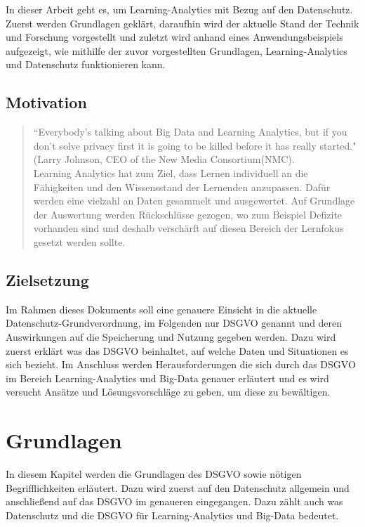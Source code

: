 \documentclass[a4paper, 12pt]{article}
\begin{document}
In dieser Arbeit geht es, um Learning-Analytics mit Bezug auf den Datenschutz. Zuerst werden Grundlagen geklärt, daraufhin wird der aktuelle Stand der Technik und Forschung vorgestellt und zuletzt wird anhand eines Anwendungsbeispiels aufgezeigt, wie mithilfe der zuvor vorgestellten Grundlagen, Learning-Analytics und Datenschutz funktionieren kann.

\subsection{Motivation}

\begin{quote}
    ``Everybody’s talking about Big Data and Learning Analytics, but if you don’t solve privacy first it is going to be killed before it has really started."(Larry Johnson, CEO of the New Media Consortium(NMC). \\
    
    Learning Analytics hat zum Ziel, dass Lernen individuell an die Fähigkeiten und den Wissensstand der Lernenden anzupassen. Dafür werden eine vielzahl an Daten gesammelt und ausgewertet. Auf Grundlage der Auswertung werden Rückschlüsse gezogen, wo zum Beispiel Defizite vorhanden sind und deshalb verschärft auf diesen Bereich der Lernfokus gesetzt werden sollte.
\end{quote}

\newpage   
\subsection{Zielsetzung}

Im Rahmen dieses Dokuments soll eine genauere Einsicht in die aktuelle Datenschutz-Grundverordnung, im Folgenden nur DSGVO genannt und deren Auswirkungen auf die Speicherung und Nutzung gegeben werden. Dazu wird zuerst erklärt was das DSGVO beinhaltet, auf welche Daten und Situationen es sich bezieht. Im Anschluss werden Herausforderungen die sich durch das DSGVO im Bereich Learning-Analytics und Big-Data genauer erläutert und es wird versucht Ansätze und Lösungsvorschläge zu geben, um diese zu bewältigen.

\section{Grundlagen}

In diesem Kapitel werden die Grundlagen des DSGVO sowie nötigen Begrifflichkeiten erläutert. Dazu wird zuerst auf den Datenschutz allgemein und anschließend auf das DSGVO im genaueren eingegangen. Dazu zählt auch was Datenschutz und die DSGVO für Learning-Analytics und Big-Data bedeutet.
\end{document}
